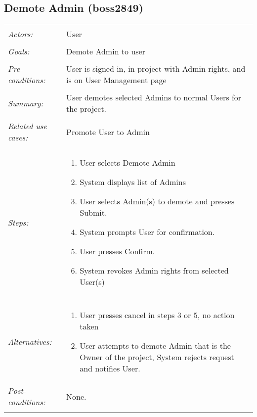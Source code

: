 \documentclass[11pt]{report}
\begin{document}
\subsection{Demote Admin  (boss2849)}
\begin{tabular}{ p{2cm} p{12cm} }
 \hline
 \\
 \textit{Actors:} & User \\ 
 \\
 \textit{Goals:} & Demote Admin to user \\
 \\
 \textit{Pre-conditions:} & User is signed in, in project with Admin rights, and is on User Management page \\
 \\
 \textit{Summary:} & User demotes selected Admins to normal Users for the project. \\ 
 \\
 \textit{Related use cases:} & Promote User to Admin \\ 
 \\
 \textit{Steps:} & \begin{enumerate}
  \item User selects Demote Admin
  \item System displays list of Admins
  \item User selects Admin(s) to demote and presses Submit.
  \item System prompts User for confirmation.
  \item User presses Confirm.
  \item System revokes Admin rights from selected User(s)
 \end{enumerate} \\
 \\
 \textit{Alternatives:} & \begin{enumerate}
  \item User presses cancel in steps 3 or 5, no action taken
  \item User attempts to demote Admin that is the Owner of the project, System rejects request and notifies User.
 \end{enumerate}
 \\
 \textit{Post-conditions:} & None. \\
 \\
\hline
\end{tabular}
\end{document}
